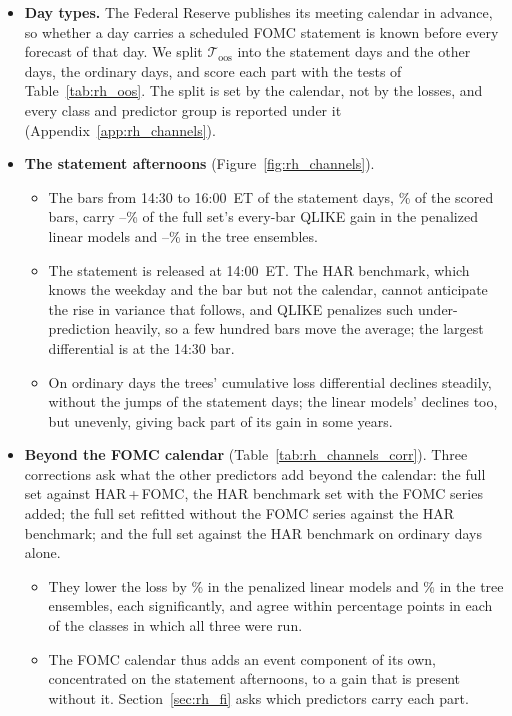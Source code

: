 \begin{itemize}
\item \textbf{Day types.} The Federal Reserve publishes its meeting calendar in advance, so whether a day carries a
  scheduled FOMC statement is known before every forecast of that day. We split $\mathcal T_{\mathrm{oos}}$ into the
  \rhchNEventDays{} statement days and the \rhchNOrdDays{} other days, the ordinary days, and score each part with the
  tests of Table~\ref{tab:rh_oos}. The split is set by the calendar, not by the losses, and every class and predictor
  group is reported under it (Appendix~\ref{app:rh_channels}).
\item \textbf{The statement afternoons} (Figure~\ref{fig:rh_channels}).
  \begin{itemize}
  \item The bars from 14:30 to 16:00~ET of the statement days, \rhchEventPmBarPct\% of the scored bars, carry
    \rhchLinShareEventPmMin--\rhchLinShareEventPmMax\% of the full set's every-bar QLIKE gain in the penalized linear
    models and \rhchTreeShareEventPmMin--\rhchTreeShareEventPmMax\% in the tree ensembles.
  \item The statement is released at 14:00~ET. The HAR benchmark, which knows the weekday and the bar but not the
    calendar, cannot anticipate the rise in variance that follows, and QLIKE penalizes such under-prediction heavily,
    so a few hundred bars move the average; the largest differential is at the 14:30 bar.
  \item On ordinary days the trees' cumulative loss differential declines steadily, without the jumps of the statement
    days; the linear models' declines too, but unevenly, giving back part of its gain in some years.
  \end{itemize}
\item \textbf{Beyond the FOMC calendar} (Table~\ref{tab:rh_channels_corr}). Three corrections ask what the other
  predictors add beyond the calendar: the full set against HAR\,+\,FOMC, the HAR benchmark set with the FOMC series
  added; the full set refitted without the FOMC series against the HAR benchmark; and the full set against the HAR
  benchmark on ordinary days alone.
  \begin{itemize}
  \item They lower the loss by \rhchCorrLinRng\% in the penalized linear models and \rhchCorrTreeRng\% in the tree
    ensembles, each significantly, and agree within \rhchAgreePp{} percentage points in each of the \rhchNCorrAgree{}
    classes in which all three were run.
  \item The FOMC calendar thus adds an event component of its own, concentrated on the statement afternoons, to a
    gain that is present without it. Section~\ref{sec:rh_fi} asks which predictors carry each part.
  \end{itemize}
\end{itemize}
